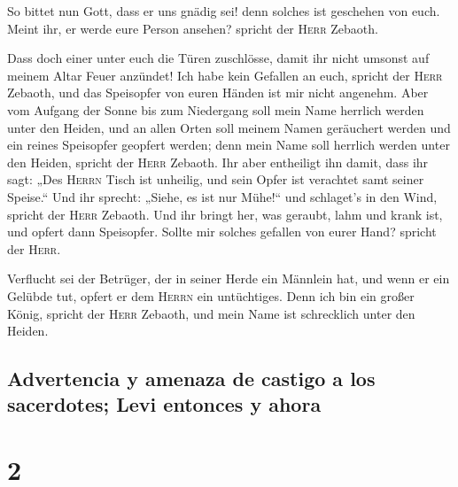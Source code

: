  So bittet nun Gott, dass er uns gnädig sei! denn solches
ist geschehen von euch. Meint ihr, er werde eure Person ansehen? spricht
der \textsc{Herr} Zebaoth.

 Dass doch einer unter euch die Türen zuschlösse, damit
ihr nicht umsonst auf meinem Altar Feuer anzündet! Ich habe kein
Gefallen an euch, spricht der \textsc{Herr} Zebaoth, und das Speisopfer
von euren Händen ist mir nicht angenehm.  Aber vom
Aufgang der Sonne bis zum Niedergang soll mein Name herrlich werden
unter den Heiden, und an allen Orten soll meinem Namen geräuchert werden
und ein reines Speisopfer geopfert werden; denn mein Name soll herrlich
werden unter den Heiden, spricht der \textsc{Herr} Zebaoth.
 Ihr aber entheiligt ihn damit, dass ihr sagt: „Des
\textsc{Herrn} Tisch ist unheilig, und sein Opfer ist verachtet samt
seiner Speise.``  Und ihr sprecht: „Siehe, es ist nur
Mühe!{}`` und schlaget's in den Wind, spricht der \textsc{Herr} Zebaoth.
Und ihr bringt her, was geraubt, lahm und krank ist, und opfert dann
Speisopfer. Sollte mir solches gefallen von eurer Hand? spricht der
\textsc{Herr}.

 Verflucht sei der Betrüger, der in seiner Herde ein
Männlein hat, und wenn er ein Gelübde tut, opfert er dem \textsc{Herrn}
ein untüchtiges. Denn ich bin ein großer König, spricht der
\textsc{Herr} Zebaoth, und mein Name ist schrecklich unter den Heiden.

\hypertarget{advertencia-y-amenaza-de-castigo-a-los-sacerdotes-levi-entonces-y-ahora}{%
\subsection{Advertencia y amenaza de castigo a los sacerdotes; Levi
entonces y
ahora}\label{advertencia-y-amenaza-de-castigo-a-los-sacerdotes-levi-entonces-y-ahora}}

\hypertarget{section-1}{%
\section{2}\label{section-1}}

